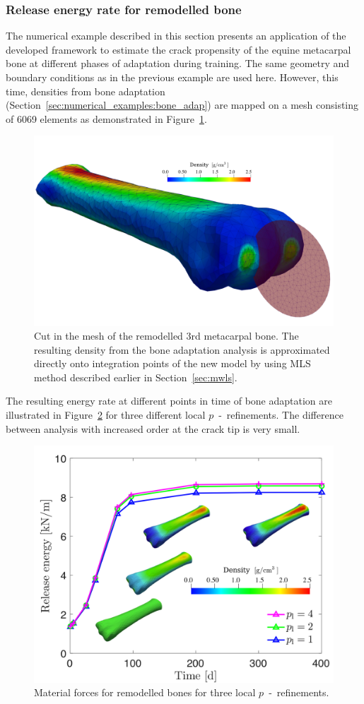\documentclass[11pt]{acmeArticle}
\numberwithin{equation}{section}
\begin{document}
\subsubsection{Release energy rate for remodelled bone}
The numerical example described in this section presents an application of the developed framework to estimate the crack propensity of the equine metacarpal bone at different phases of adaptation during training. 
The same geometry and boundary conditions as in the previous example are used here. 
However, this time, densities from bone adaptation (Section~\ref{sec:numerical_examples:bone_adap}) are mapped on a mesh consisting of 6069 elements as demonstrated in Figure~\ref{fig:frackmeshcutting}. 
\begin{figure}
	\centering
	\includegraphics[width=0.8\linewidth]{Figures/frack_mesh_cutting.png}
	\caption{Cut in the mesh of the remodelled 3rd metacarpal bone. The resulting density from the bone adaptation analysis is approximated directly onto integration points of the new model by using MLS method described earlier in Section~\ref{sec:mwls}. }
	\label{fig:frackmeshcutting}
\end{figure}
The resulting energy rate at different points in time of bone adaptation are illustrated in Figure~\ref{fig:crackmc3release} for three different local $p$~-~refinements. The difference between analysis with increased order at the crack tip is very small. 
\begin{figure}
	\centering
	\includegraphics[width=1\linewidth]{Figures/graphs/crack_mc3_release.png}
	\caption{Material forces for remodelled bones for three local $p$~-~refinements.}
	\label{fig:crackmc3release}
\end{figure}
\end{document}
